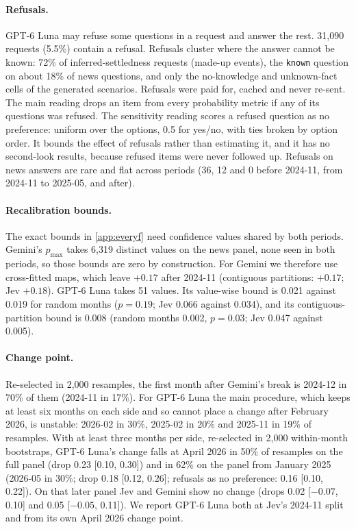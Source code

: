 \documentclass[10pt,twocolumn]{article}
\newcommand{\pmax}{p_{\max}}
\begin{document}
\paragraph{Refusals.} GPT-6 Luna may refuse some questions in a request and
answer the rest. 31{,}090 requests (5.5\%) contain a refusal. Refusals
cluster where the answer cannot be known: 72\% of inferred-settledness
requests (made-up events), the \texttt{known} question on about 18\% of news
questions, and only the no-knowledge and unknown-fact cells of the generated
scenarios. Refusals were paid for, cached and never re-sent. The main
reading drops an item from every probability metric if any of its questions
was refused. The sensitivity reading scores a refused question as no
preference: uniform over the options, 0.5 for yes/no, with ties broken by
option order. It bounds the effect of refusals rather than estimating it,
and it has no second-look results, because refused items were never followed
up. Refusals on news answers are rare and flat across periods (36, 12 and 0
before 2024-11, from 2024-11 to 2025-05, and after).

\paragraph{Recalibration bounds.} The exact bounds in \cref{app:everyf} need
confidence values shared by both periods. Gemini's $\pmax$ takes 6{,}319
distinct values on the news panel, none seen in both periods, so those
bounds are zero by construction. For Gemini we therefore use cross-fitted
maps, which leave $+0.17$ after 2024-11 (contiguous partitions: $+0.17$; Jev
$+0.18$). GPT-6 Luna takes 51 values. Its value-wise bound is 0.021 against
0.019 for random months ($p=0.19$; Jev 0.066 against 0.034), and its
contiguous-partition bound is 0.008 (random months 0.002, $p=0.03$; Jev
0.047 against 0.005).

\paragraph{Change point.} Re-selected in 2{,}000 resamples, the first month
after Gemini's break is 2024-12 in 70\% of them (2024-11 in 17\%). For GPT-6
Luna the main procedure, which keeps at least six months on each side and so
cannot place a change after February 2026, is unstable: 2026-02 in 30\%,
2025-02 in 20\% and 2025-11 in 19\% of resamples. With at least three months
per side, re-selected in 2{,}000 within-month bootstraps, GPT-6 Luna's change
falls at April 2026 in 50\% of resamples on the full panel (drop 0.23 [0.10,
0.30]) and in 62\% on the panel from January 2025 (2026-05 in 30\%; drop
0.18 [0.12, 0.26]; refusals as no preference: 0.16 [0.10, 0.22]). On that
later panel Jev and Gemini show no change (drops 0.02 [$-0.07$, 0.10] and
0.05 [$-0.05$, 0.11]). We report GPT-6 Luna both at Jev's 2024-11 split and
from its own April 2026 change point.
\end{document}
